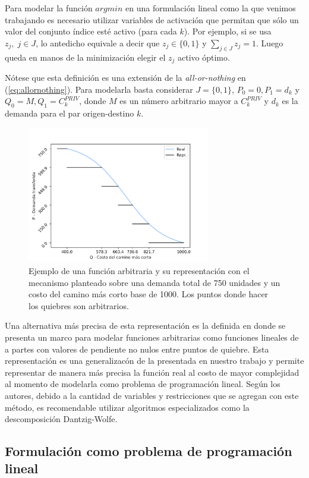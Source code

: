 Para modelar la función $argmin$ en una formulación lineal como la que venimos trabajando es necesario utilizar variables de activación que permitan que sólo un valor del conjunto índice esté activo (para cada $k$). Por ejemplo, si se usa $z_j,\; j \in J$, lo antedicho equivale a decir que $z_j \in \{0,1\}$ y $\sum_{j \in J} z_j = 1$. Luego queda en manos de la minimización elegir el $z_j$ activo óptimo.

Nótese que esta definición es una extensión de la {\it all-or-nothing} en (\ref{eq:allornothing}). Para modelarla basta considerar $J = \{0, 1\}$, $P_0 = 0, P_1 = d_k$ y $Q_0 = M, Q_1 = C^{PRIV}_k$, donde $M$ es un número arbitrario mayor a $C^{PRIV}_k$ y $d_k$ es la demanda para el par origen-destino $k$.

\begin{figure}[h!]
  \centering
  \includegraphics[width=8cm]{../resources/f_example.png}
  \caption{Ejemplo de una función arbitraria y su representación con el mecanismo planteado sobre una demanda total de 750 unidades y un costo del camino más corto base de 1000. Los puntos donde hacer los quiebres son arbitrarios.}
  \label{fig:fdrawexample}
\end{figure}

Una alternativa más precisa de esta representación es la definida en \textcite{crainic2021ch8} donde se presenta un marco para modelar funciones arbitrarias como funciones lineales de a partes con valores de pendiente no nulos entre puntos de quiebre. Esta representación es una generalizacón de la presentada en nuestro trabajo y permite representar de manera más precisa la función real al costo de mayor complejidad al momento de modelarla como problema de programación lineal. Según los autores, debido a la cantidad de variables y restricciones que se agregan con este método, es recomendable utilizar algoritmos especializados como la descomposición Dantzig-Wolfe.

\FloatBarrier
\subsection{Formulación como problema de programación lineal}


